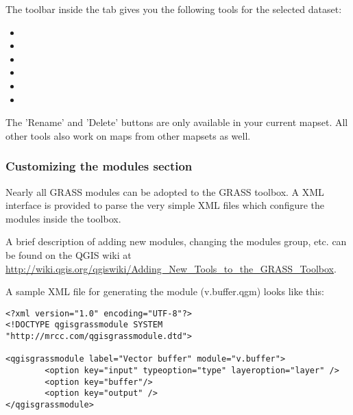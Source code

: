 The toolbar inside the  tab gives you the following tools for the selected dataset:
\begin{itemize}
\item {}
\item {}
\item {}
\item {}
\item {}
\item {}
\end{itemize}

The 'Rename' and 'Delete' buttons are only available in your current mapset. All other tools also work on
maps from other mapsets as well.


\subsubsection{Customizing the modules section} 
\label{sec:toolbox-customizing}

Nearly all GRASS modules can be adopted to the GRASS toolbox. A XML interface is provided to parse
the very simple XML files which configure the modules inside the toolbox.

A brief description of adding new modules, changing the modules group, etc. can be found on the QGIS wiki
at \url{http://wiki.qgis.org/qgiswiki/Adding\_New\_Tools\_to\_the\_GRASS\_Toolbox}.

A sample XML file for generating the module  (v.buffer.qgm) looks like this:
\begin{verbatim}
<?xml version="1.0" encoding="UTF-8"?>
<!DOCTYPE qgisgrassmodule SYSTEM "http://mrcc.com/qgisgrassmodule.dtd">

<qgisgrassmodule label="Vector buffer" module="v.buffer">
        <option key="input" typeoption="type" layeroption="layer" />
        <option key="buffer"/>
        <option key="output" />
</qgisgrassmodule>
\end{verbatim}

